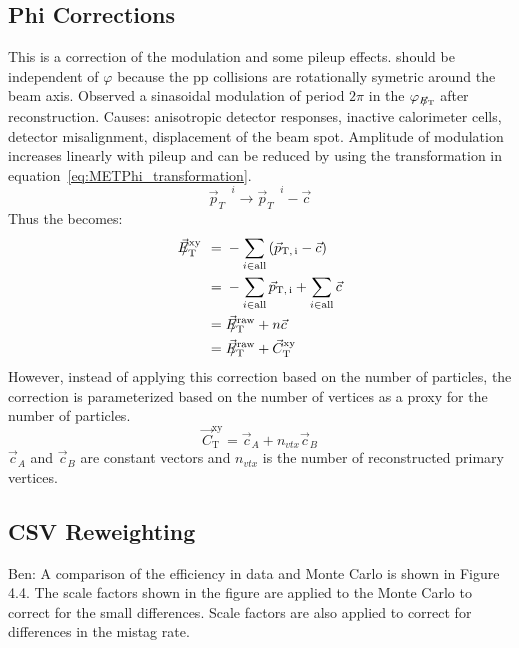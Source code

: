 \subsection{\VETslash Phi Corrections}
\label{sec:met_phi_corrections}
This is a correction of the \ETslash modulation and some pileup effects.
\VETslash should be independent of $\varphi$ because the pp collisions are rotationally symetric around the beam axis.
Observed a sinasoidal modulation of period $2\pi$ in the $\varphi_{E_{\mathrm{T}}\hspace{-0.9em}/\kern0.45em}$ after reconstruction.
Causes: anisotropic detector responses, inactive calorimeter cells, detector misalignment, displacement of the beam spot.
Amplitude of modulation increases linearly with pileup and can be reduced by using the transformation in equation~\ref{eq:METPhi_transformation}.
\begin{equation}
\label{eq:METPhi_transformation}
{\vec{p}_{T}}^{\text{ }i}\rightarrow{\vec{p}_{T}}^{\text{ }i}-\vec{c}
\end{equation}
Thus the \VETslash becomes:
\begin{equation}
    \label{eq:METPhi}
    \begin{aligned}
\VETslashxy={}&-\sum_{i \in \textrm{all}}\left(\ptvecsub{i}-\vec{c}\right) \\
={}&-\sum_{i \in \textrm{all}}\ptvecsub{i}+\sum_{i \in \textrm{all}}\vec{c} \\
={}&\VETslashraw+n\vec{c} \\
={}&\VETslashraw+{\vec C}_{\mathrm{T}}^{\mathrm{xy}}
    \end{aligned}
\end{equation}
However, instead of applying this correction based on the number of particles, the correction is parameterized based on the number of vertices as a proxy for the number of particles.
\begin{equation}
\label{eq:METPhi_correction}
{\vec C}_{\mathrm{T}}^{\mathrm{xy}}=\vec{c}_{A}+n_{vtx}\vec{c}_{B}
\end{equation}
$\vec{c}_{A}$ and $\vec{c}_{B}$ are constant vectors and $n_{vtx}$ is the number of reconstructed primary vertices.

\subsection{CSV Reweighting}
Ben: A comparison of the efficiency in data and Monte Carlo is shown in Figure 4.4. The scale factors shown in the figure are applied to the Monte Carlo to correct for the small differences. Scale factors are also applied to correct for differences in the mistag rate.


